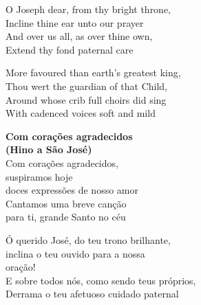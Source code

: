 \documentclass[a5paper,9pt]{memoir}
\begin{document}
{\begin{paracol}{2}
{O Joseph dear, from thy bright throne,\\
Incline thine ear unto our prayer\\
And over us all, as over thine own,\\
Extend thy fond paternal care

More favoured than earth's greatest king,\\
Thou wert the guardian of that Child,\\
Around whose crib full choirs did sing\\
With cadenced voices soft and mild
}
\switchcolumn

\textbf{Com corações agradecidos}\\
\textbf{(Hino a São José)}\\


Com corações agradecidos,\\ suspiramos hoje\\
doces expressões de nosso amor\\
Cantamos uma breve canção\\
para ti, grande Santo no céu


Ó querido José, do teu trono brilhante,\\
inclina o teu ouvido para a nossa\\ oração!\\
E sobre todos nós, como sendo teus próprios,\\
Derrama o teu afetuoso cuidado paternal



\end{paracol}}
\end{document}
